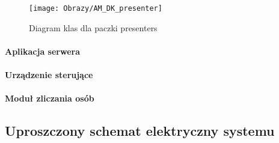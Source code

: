		\begin{figure}[ht!]
			\centering
			\texttt{[image: Obrazy/AM\_DK\_presenter]}
			\caption{Diagram klas dla paczki presenters}
			\label{Diagram klas dla paczki presenters}
		\end{figure}

		\newpage		

		\paragraph*{Aplikacja serwera}
		
		\paragraph*{Urządzenie sterujące}
		\paragraph*{Moduł zliczania osób}

\newpage		
\subsection{Uproszczony schemat elektryczny systemu}\label{sec:Schemat elektryczny zamka}

\newpage
